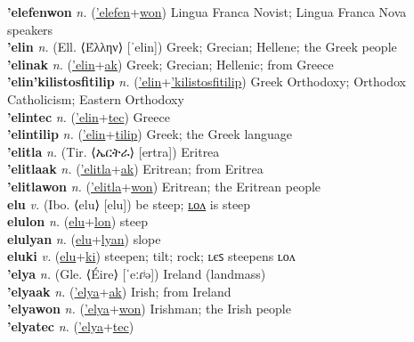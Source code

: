 \textbf{'elefenwon} \textit{n.} (\hyperref['elefen]{'elefen}+\hyperref[won]{won})
Lingua Franca Novist; Lingua Franca Nova speakers \label{'elefenwon} \\
\textbf{'elin} \textit{n.} (Ell. ⟨Έλλην⟩ [ˈelin])
Greek; Grecian; Hellene; the Greek people \label{'elin} \\
\textbf{'elinak} \textit{n.} (\hyperref['elin]{'elin}+\hyperref[ak]{ak})
Greek; Grecian; Hellenic; from Greece \label{'elinak} \\
\textbf{'elin'kilistosfitilip} \textit{n.} (\hyperref['elin]{'elin}+\hyperref['kilistosfitilip]{'kilistosfitilip})
Greek Orthodoxy; Orthodox Catholicism; Eastern Orthodoxy \label{'elin'kilistosfitilip} \\
\textbf{'elintec} \textit{n.} (\hyperref['elin]{'elin}+\hyperref[tec]{tec})
Greece \label{'elintec} \\
\textbf{'elintilip} \textit{n.} (\hyperref['elin]{'elin}+\hyperref[tilip]{tilip})
Greek; the Greek language \label{'elintilip} \\
\textbf{'elitla} \textit{n.} (Tir. ⟨ኤርትራ⟩ [ertra])
Eritrea \label{'elitla} \\
\textbf{'elitlaak} \textit{n.} (\hyperref['elitla]{'elitla}+\hyperref[ak]{ak})
Eritrean; from Eritrea \label{'elitlaak} \\
\textbf{'elitlawon} \textit{n.} (\hyperref['elitla]{'elitla}+\hyperref[won]{won})
Eritrean; the Eritrean people \label{'elitlawon} \\
\textbf{elu} \textit{v.} (Ibo. ⟨elu⟩ [elu])
be steep; \hyperref[elulon]{ʟᴏᴧ} is steep \label{elu} \\
\textbf{elulon} \textit{n.} (\hyperref[elu]{elu}+\hyperref[lon]{lon})
steep \label{elulon} \\
\textbf{elulyan} \textit{n.} (\hyperref[elu]{elu}+\hyperref[lyan]{lyan})
slope \label{elulyan} \\
\textbf{eluki} \textit{v.} (\hyperref[elu]{elu}+\hyperref[ki]{ki})
steepen; tilt; rock; ʟєꜱ steepens ʟᴏᴧ \label{eluki} \\
\textbf{'elya} \textit{n.} (Gle. ⟨Éire⟩ [ˈeːɾʲə])
Ireland (landmass) \label{'elya} \\
\textbf{'elyaak} \textit{n.} (\hyperref['elya]{'elya}+\hyperref[ak]{ak})
Irish; from Ireland \label{'elyaak} \\
\textbf{'elyawon} \textit{n.} (\hyperref['elya]{'elya}+\hyperref[won]{won})
Irishman; the Irish people \label{'elyawon} \\
\textbf{'elyatec} \textit{n.} (\hyperref['elya]{'elya}+\hyperref[tec]{tec})
